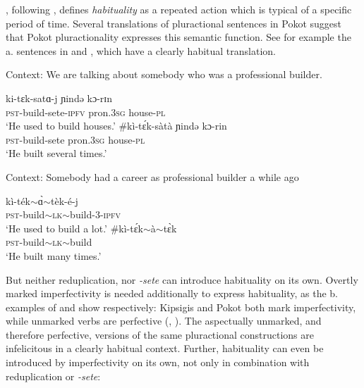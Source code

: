 \documentclass[output=paper,colorlinks,citecolor=brown
]{langscibook}
\begin{document}

\citet[24]{Mattiola2019}, following \citet{Comrie76}, defines \textit{habituality} as a repeated action which is typical of a specific period of time. Several translations of pluractional sentences in Pokot suggest that Pokot pluractionality expresses this semantic function. See for example the a. sentences in  and , which have a clearly habitual translation. 


\ea Context: We are talking about somebody who was a professional builder. \label{ex:fiebig:builder1}
\begin{xlist}
\ex 
\gll ki-tɛk-satɑ-j ɲində kɔ-rɪn\\
\textsc{pst}-build-sete-\textsc{ipfv} pron.\textsc{3sg} house-\textsc{pl}\\
\glt `He used to build houses.'
\ex 
\gll \#kì-tɛ́k-sàtà ɲində kɔ-rin\\
\textsc{pst}-build-sete pron.\textsc{3sg} house-\textsc{pl}\\
\glt `He built several times.'
\end{xlist}
\z

\ea  Context: Somebody had a career as professional builder a while ago\label{ex:fiebig:builder2}
\begin{xlist}
\ex 
\gll kì-ték$\sim$ɑ̀$\sim$tèk-é-j\\
\textsc{pst}-build$\sim$\textsc{lk}$\sim$build-3-\textsc{ipfv}\\
\glt `He used to build a lot.'
\ex 
\gll \#kì-tɛ́k$\sim$à$\sim$tɛ̀k\\
\textsc{pst}-build$\sim$\textsc{lk}$\sim$build\\ 
\glt `He built many times.'
\end{xlist}
\z
    
\noindent But neither reduplication, nor \textit{-sete} can introduce habituality on its own. Overtly marked imperfectivity is needed additionally to express habituality, as the b. examples of  and  show respectively: Kipsigis and Pokot both mark imperfectivity, while unmarked verbs are perfective (\citealt{Kouneli2020}, \citealt{Toweet79}). The aspectually unmarked, and therefore perfective, versions of the same pluractional constructions are infelicitous in a clearly habitual context. 
Further, habituality can even be introduced by imperfectivity on its own, not only in combination with reduplication or \textit{-sete}: 
\end{document}
